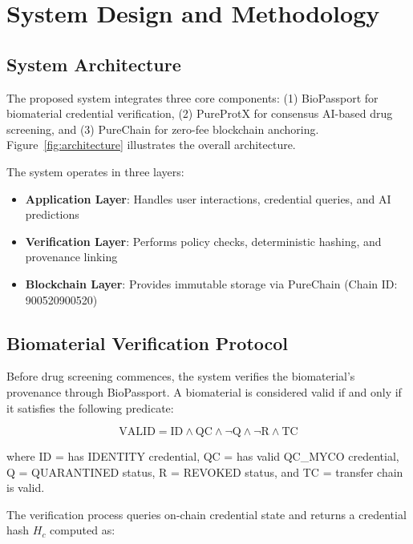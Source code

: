 
\section{System Design and Methodology}

\subsection{System Architecture}

The proposed system integrates three core components: (1) BioPassport for biomaterial credential verification, (2) PureProtX for consensus AI-based drug screening, and (3) PureChain for zero-fee blockchain anchoring. Figure~\ref{fig:architecture} illustrates the overall architecture.

The system operates in three layers:
\begin{itemize}
    \item \textbf{Application Layer}: Handles user interactions, credential queries, and AI predictions
    \item \textbf{Verification Layer}: Performs policy checks, deterministic hashing, and provenance linking
    \item \textbf{Blockchain Layer}: Provides immutable storage via PureChain (Chain ID: 900520900520)
\end{itemize}

\subsection{Biomaterial Verification Protocol}

Before drug screening commences, the system verifies the biomaterial's provenance through BioPassport. A biomaterial is considered valid if and only if it satisfies the following predicate:

\begin{equation}
    \text{VALID} = \text{ID} \land \text{QC} \land \neg\text{Q} \land \neg\text{R} \land \text{TC}
\end{equation}

\noindent where ID = has IDENTITY credential, QC = has valid QC\_MYCO credential, Q = QUARANTINED status, R = REVOKED status, and TC = transfer chain is valid.

The verification process queries on-chain credential state and returns a credential hash $H_c$ computed as:

